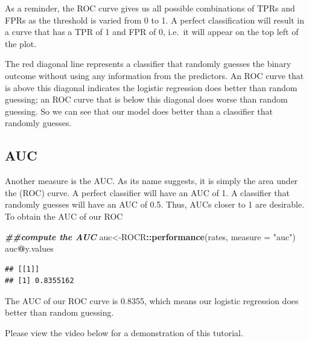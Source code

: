 \documentclass[
]{book}
\newenvironment{Shaded}{\begin{snugshade}}{\end{snugshade}}
\newcommand{\AttributeTok}[1]{\textcolor[rgb]{0.13,0.29,0.53}{#1}}
\newcommand{\DocumentationTok}[1]{\textcolor[rgb]{0.56,0.35,0.01}{\textbf{\textit{#1}}}}
\newcommand{\FunctionTok}[1]{\textcolor[rgb]{0.13,0.29,0.53}{\textbf{#1}}}
\newcommand{\NormalTok}[1]{#1}
\newcommand{\OtherTok}[1]{\textcolor[rgb]{0.56,0.35,0.01}{#1}}
\newcommand{\SpecialCharTok}[1]{\textcolor[rgb]{0.81,0.36,0.00}{\textbf{#1}}}
\newcommand{\StringTok}[1]{\textcolor[rgb]{0.31,0.60,0.02}{#1}}
\begin{document}
As a reminder, the ROC curve gives us all possible combinations of TPRs and FPRs as the threshold is varied from 0 to 1. A perfect classification will result in a curve that has a TPR of 1 and FPR of 0, i.e.~it will appear on the top left of the plot.

The red diagonal line represents a classifier that randomly guesses the binary outcome without using any information from the predictors. An ROC curve that is above this diagonal indicates the logistic regression does better than random guessing; an ROC curve that is below this diagonal does worse than random guessing. So we can see that our model does better than a classifier that randomly guesses.

\hypertarget{auc-1}{%
\subsection*{AUC}\label{auc-1}}

Another measure is the AUC. As its name suggests, it is simply the area under the (ROC) curve. A perfect classifier will have an AUC of 1. A classifier that randomly guesses will have an AUC of 0.5. Thus, AUCs closer to 1 are desirable. To obtain the AUC of our ROC

\begin{Shaded}
\begin{Highlighting}[]
\DocumentationTok{\#\#compute the AUC}
\NormalTok{auc}\OtherTok{\textless{}{-}}\NormalTok{ROCR}\SpecialCharTok{::}\FunctionTok{performance}\NormalTok{(rates, }\AttributeTok{measure =} \StringTok{"auc"}\NormalTok{)}
\NormalTok{auc}\SpecialCharTok{@}\NormalTok{y.values}
\end{Highlighting}
\end{Shaded}

\begin{verbatim}
## [[1]]
## [1] 0.8355162
\end{verbatim}

The AUC of our ROC curve is 0.8355, which means our logistic regression does better than random guessing.

Please view the video below for a demonstration of this tutorial.

  
\end{document}
